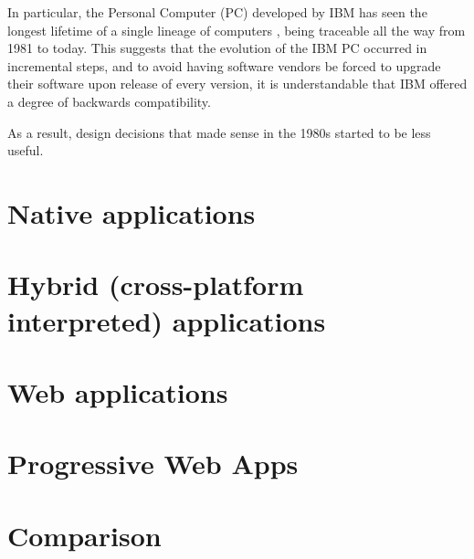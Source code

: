 In particular, the Personal Computer (PC) developed by IBM has seen the longest lifetime of a single lineage of computers \cite{TGPCHis}, being traceable all the way from 1981 to today. This suggests that the evolution of the IBM PC occurred in incremental steps, and to avoid having software vendors be forced to upgrade their software upon release of every version, it is understandable that IBM offered a degree of backwards compatibility.

As a result, design decisions that made sense in the 1980s started to be less useful.


\section{Native applications}

\section{Hybrid (cross-platform interpreted) applications}

\section{Web applications}

\section{Progressive Web Apps}

\section{Comparison}